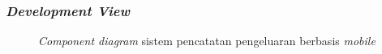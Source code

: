 \subsubsection{\emph{Development View}}
\label{subsubsec:development-view}
\begin{figure}[htbp]
    \centering
    \caption{\emph{Component diagram} sistem pencatatan pengeluaran berbasis \emph{mobile}}
    \label{fig:component-diagram}
\end{figure}